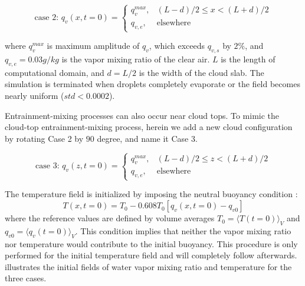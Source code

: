 \begin{equation}
\mbox{case 2: } q_v(x,t=0) = 
\left\{\begin{array}{lr}
q_v^{max}, & (L-d)/2 \le x < (L+d)/2\\
q_{v,e}, & \mbox{elsewhere}
\end{array}\right.\label{case2}
\end{equation}

where $q_v^{max}$ is maximum amplitude of $q_v$, which exceeds $q_{v,s}$ by
$2\%$, and $q_{v,e} = 0.03g/kg$ is the vapor mixing ratio of the clear air. $L$
is the length of computational domain, and $d = L/2$ is the width of the cloud
slab. The simulation is terminated when droplets completely evaporate or the
field becomes nearly uniform ($std<0.0002$).

Entrainment-mixing processes can also occur near cloud tops. To mimic the
cloud-top entrainment-mixing process, herein we add a new cloud configuration
by rotating Case 2 by $90$ degree, and name it Case 3.

\begin{equation}
\mbox{case 3: } q_v(z,t=0) = 
\left\{\begin{array}{lr}
q_v^{max}, & (L-d)/2 \le z < (L+d)/2\\
q_{v,e}, & \mbox{elsewhere}
\end{array}\right.\label{case3}
\end{equation}

The temperature field is initialized by imposing the neutral buoyancy condition \cite{Kumar14}:
\begin{equation}
T(x,t = 0) = T_0 - 0.608T_0[q_v(x,t = 0) - q_{v0}]
\end{equation}
where the reference values are defined by volume averages $T_0 = \langle
T(t=0)\rangle_V$ and $q_{v0} = \langle q_v(t=0)\rangle_V$. This condition
implies that neither the vapor mixing ratio nor temperature would contribute to
the initial buoyancy. This procedure is only performed for the initial
temperature field and will completely follow  afterwards.
 illustrates the initial fields of water vapor mixing
ratio and temperature for the three cases.

